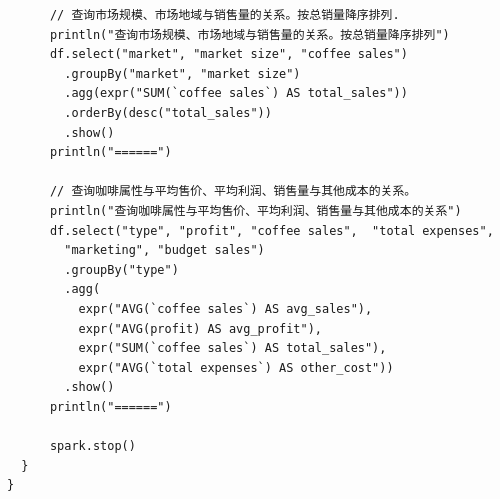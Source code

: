 \documentclass{article}
\begin{document}
\begin{center}
\begin{verbatim}
      // 查询市场规模、市场地域与销售量的关系。按总销量降序排列.
      println("查询市场规模、市场地域与销售量的关系。按总销量降序排列")
      df.select("market", "market size", "coffee sales")
        .groupBy("market", "market size")
        .agg(expr("SUM(`coffee sales`) AS total_sales"))
        .orderBy(desc("total_sales"))
        .show()
      println("======")

      // 查询咖啡属性与平均售价、平均利润、销售量与其他成本的关系。
      println("查询咖啡属性与平均售价、平均利润、销售量与其他成本的关系")
      df.select("type", "profit", "coffee sales",  "total expenses",
        "marketing", "budget sales")
        .groupBy("type")
        .agg(
          expr("AVG(`coffee sales`) AS avg_sales"),
          expr("AVG(profit) AS avg_profit"),
          expr("SUM(`coffee sales`) AS total_sales"),
          expr("AVG(`total expenses`) AS other_cost"))
        .show()
      println("======")

      spark.stop()
  }
}
\end{verbatim}
\end{center}
\end{document}
